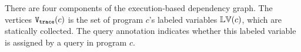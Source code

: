 There are four components of the execution-based dependency graph. 
The vertices $\mathtt{{V_{trace}}}(c)$ is the set of program $c$'s labeled variables $\mathbb{LV}(c)$,
which are statically collected.
The query annotation 
indicates whether this labeled variable is assigned by a query in program $c$.

